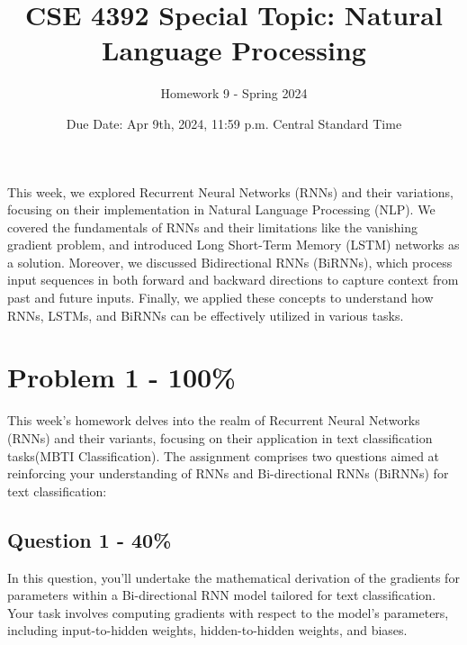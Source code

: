 \documentclass{article}
\begin{document}
\title{CSE 4392 Special Topic: Natural Language Processing}
\author{Homework 9 - Spring 2024}
\date{Due Date: Apr 9th, 2024, 11:59 p.m. Central Standard Time}
\maketitle
\thispagestyle{fancy}


This week, we explored Recurrent Neural Networks (RNNs) and their variations, focusing on their implementation in Natural Language Processing (NLP). We covered the fundamentals of RNNs and their limitations like the vanishing gradient problem, and introduced Long Short-Term Memory (LSTM) networks as a solution. Moreover, we discussed Bidirectional RNNs (BiRNNs), which process input sequences in both forward and backward directions to capture context from past and future inputs. Finally, we applied these concepts to understand how RNNs, LSTMs, and BiRNNs can be effectively utilized in various tasks.
\section*{Problem 1 - 100\%}

This week's homework delves into the realm of Recurrent Neural Networks (RNNs) and their variants, focusing on their application in text classification tasks(MBTI Classification). The assignment comprises two questions aimed at reinforcing your understanding of RNNs and Bi-directional RNNs (BiRNNs) for text classification:

\subsection*{Question 1 - 40\%}
In this question, you'll undertake the mathematical derivation of the gradients for parameters within a Bi-directional RNN model tailored for text classification. Your task involves computing gradients with respect to the model's parameters, including input-to-hidden weights, hidden-to-hidden weights, and biases.
\end{document}
